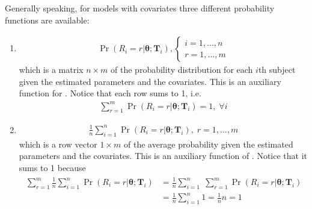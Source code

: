 \documentclass[letterpaper,10pt,english]{sphinxmanual}
\begin{document}
\sphinxAtStartPar
Generally speaking, for models with covariates three different probability functions are available:
\begin{enumerate}
%
\item {} \begin{description}
\begin{equation*}
\begin{split}\Pr(R_i=r|\pmb\theta; \pmb T_i),
\left\{
\begin{array}{l}
i=1,\ldots,n
\\
r=1,\ldots,m
\end{array}
\right.\end{split}
\end{equation*}
\sphinxAtStartPar
which is a matrix \(n \times m\) of the probability distribution for each \(i\)\sphinxhyphen{}th subject
given the estimated parameters and the covariates. This is an auxiliary function
for . Notice that each row sums to 1, i.e.
\begin{equation*}
\begin{split}\sum_{r=1}^m \Pr(R_i=r|\pmb\theta; \pmb T_i) = 1,\; \forall i\end{split}
\end{equation*}
\end{description}

\item {} \begin{description}
\begin{equation*}
\begin{split}\frac{1}{n} \sum_{i=1}^n \Pr(R_i=r|\pmb\theta; \pmb T_i),\; r=1,\ldots,m\end{split}
\end{equation*}
\sphinxAtStartPar
which is a row vector \(1 \times m\) of the average probability given the
estimated parameters and the covariates. This is an auxiliary function
of . Notice that it sums to 1 because
\begin{equation*}
\begin{split}\begin{align*}
\sum_{r=1}^m \frac{1}{n} \sum_{i=1}^n \Pr(R_i=r|\pmb\theta; \pmb T_i)
&= \frac{1}{n} \sum_{i=1}^n \; \sum_{r=1}^m \Pr(R_i=r|\pmb\theta; \pmb T_i)
\\&= \frac{1}{n} \sum_{i=1}^n 1 = \frac{1}{n} n = 1
\end{align*}\end{split}
\end{equation*}
\end{description}


\end{enumerate}
\end{document}
